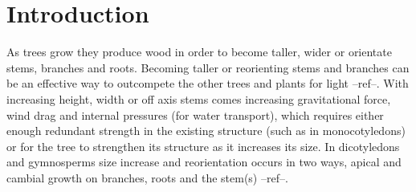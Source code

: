 \chapter{Introduction}
As trees grow they produce wood in order to become taller, wider or orientate
stems, branches and roots. Becoming taller or reorienting stems and branches can
be an effective way to outcompete the other trees and plants for light --ref--.
With increasing height, width or off axis stems comes increasing gravitational
force, wind drag and internal pressures (for water transport), which requires
either enough redundant strength in the existing structure (such as in
monocotyledons) or for the tree to strengthen its structure as it increases its
size. In dicotyledons and gymnosperms size increase and reorientation occurs in
two ways, apical and cambial growth on branches, roots and the stem(s) --ref--.